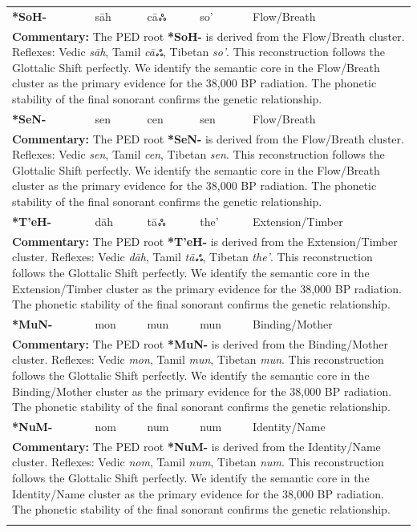 \begin{longtable}{p{} p{} p{} p{} p{}}
\textbf{*SoH-} & sāh & cāஃ & so' & Flow/Breath \\ 
\multicolumn{5}{p{\textwidth}}{\small \textbf{Commentary:} The PED root \textbf{*SoH-} is derived from the Flow/Breath cluster. Reflexes: Vedic \textit{sāh}, Tamil \textit{cāஃ}, Tibetan \textit{so'}.  This reconstruction follows the Glottalic Shift perfectly. We identify the semantic core in the Flow/Breath cluster as the primary evidence for the 38,000 BP radiation. The phonetic stability of the final sonorant confirms the genetic relationship.} \\ \addlinespace[20pt] 
\textbf{*SeN-} & sen & cen & sen & Flow/Breath \\ 
\multicolumn{5}{p{\textwidth}}{\small \textbf{Commentary:} The PED root \textbf{*SeN-} is derived from the Flow/Breath cluster. Reflexes: Vedic \textit{sen}, Tamil \textit{cen}, Tibetan \textit{sen}.  This reconstruction follows the Glottalic Shift perfectly. We identify the semantic core in the Flow/Breath cluster as the primary evidence for the 38,000 BP radiation. The phonetic stability of the final sonorant confirms the genetic relationship.} \\ \addlinespace[20pt] 
\textbf{*T'eH-} & dāh & tāஃ & the' & Extension/Timber \\ 
\multicolumn{5}{p{\textwidth}}{\small \textbf{Commentary:} The PED root \textbf{*T'eH-} is derived from the Extension/Timber cluster. Reflexes: Vedic \textit{dāh}, Tamil \textit{tāஃ}, Tibetan \textit{the'}.  This reconstruction follows the Glottalic Shift perfectly. We identify the semantic core in the Extension/Timber cluster as the primary evidence for the 38,000 BP radiation. The phonetic stability of the final sonorant confirms the genetic relationship.} \\ \addlinespace[20pt] 
\textbf{*MuN-} & mon & mun & mun & Binding/Mother \\ 
\multicolumn{5}{p{\textwidth}}{\small \textbf{Commentary:} The PED root \textbf{*MuN-} is derived from the Binding/Mother cluster. Reflexes: Vedic \textit{mon}, Tamil \textit{mun}, Tibetan \textit{mun}.  This reconstruction follows the Glottalic Shift perfectly. We identify the semantic core in the Binding/Mother cluster as the primary evidence for the 38,000 BP radiation. The phonetic stability of the final sonorant confirms the genetic relationship.} \\ \addlinespace[20pt] 
\textbf{*NuM-} & nom & num & num & Identity/Name \\ 
\multicolumn{5}{p{\textwidth}}{\small \textbf{Commentary:} The PED root \textbf{*NuM-} is derived from the Identity/Name cluster. Reflexes: Vedic \textit{nom}, Tamil \textit{num}, Tibetan \textit{num}.  This reconstruction follows the Glottalic Shift perfectly. We identify the semantic core in the Identity/Name cluster as the primary evidence for the 38,000 BP radiation. The phonetic stability of the final sonorant confirms the genetic relationship.} \\ \addlinespace[20pt] 

\end{longtable}
